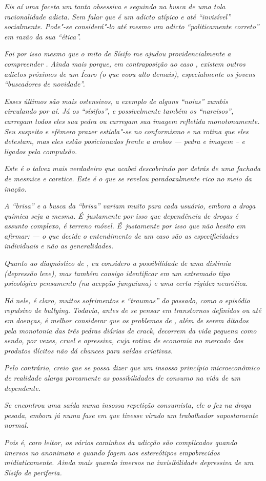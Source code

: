 \emph{Eis aí uma faceta um tanto obsessiva e seguindo na busca de uma
tola racionalidade adicta. Sem falar que  é um adicto atípico e até
``invisível'' socialmente. Pode"-se considerá"-lo até mesmo um adicto
``politicamente correto'' em razão da sua ``ética''.}~

\emph{Foi por isso mesmo que o mito de Sísifo me ajudou
providencialmente a compreender . Ainda mais porque, em contraposição
ao caso , existem outros adictos próximos de um Ícaro (o que voou alto
demais), especialmente os jovens ``buscadores de novidade''.}~

\emph{Esses últimos são mais ostensivos, a exemplo de alguns ``noias''
zumbis circulando por aí. Já os ``sísifos'', e possivelmente também os
``narcisos'', carregam todos eles sua pedra ou carregam sua imagem
refletida monotonamente. Seu suspeito e efêmero prazer estiola"-se no
conformismo e na rotina que eles detestam, mas eles estão posicionados
frente a ambos --- pedra e imagem -- e ligados pela compulsão.}~

\emph{Este é o  talvez mais verdadeiro que acabei descobrindo por
detrás de uma fachada de mesmice e caretice. Este é o  que se revelou
paradoxalmente rico no meio da inação.}~

\emph{A ``brisa'' e a busca da ``brisa'' variam muito para cada usuário,
embora a droga química seja a mesma. É~justamente por isso que
dependência de drogas é assunto complexo, é terreno móvel. É~justamente
por isso que não hesito em afirmar: --- o que decide o entendimento de
um caso são as especificidades individuais e não as generalidades.}~

\emph{Quanto ao diagnóstico de , eu considero a possibilidade de uma
distimia (depressão leve), mas também consigo identificar em  um
extremado tipo psicológico pensamento (na acepção junguiana) e uma certa
rigidez neurótica.}~

\emph{Há nele, é claro, muitos sofrimentos e ``traumas'' do passado,
como o episódio repulsivo de bullying. Todavia, antes de se pensar em
transtornos definidos ou até em doenças, é melhor considerar que os
problemas de , além de serem ditados pela monotonia das três pedras
diárias de crack, decorrem da vida pequena como sendo, por vezes, cruel
e opressiva, cuja rotina de economia no mercado dos produtos ilícitos
não dá chances para saídas criativas.}~

\emph{Pelo contrário, creio que se possa dizer que um insosso princípio
microeconômico de realidade alarga porcamente as possibilidades de
consumo na vida de um dependente.}~

\emph{Se  encontrou uma saída numa insossa repetição consumista, ele o
fez na droga pesada, embora já numa fase em que tivesse virado um
trabalhador supostamente normal.}~

\emph{Pois é, caro leitor, os vários caminhos da adicção são complicados
quando imersos no anonimato e quando fogem aos estereótipos empobrecidos
midiaticamente. Ainda mais quando imersos na invisibilidade depressiva
de um Sísifo de periferia.}
\endgroup